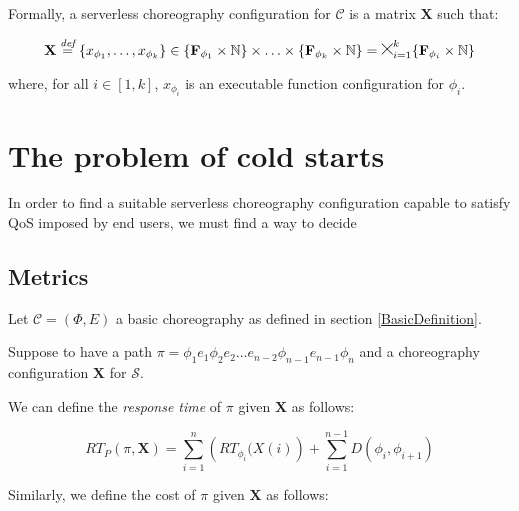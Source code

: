 Formally, a serverless choreography configuration for $\mathcal{C}$ is a matrix $\textbf{X}$ such that:

\begin{equation}
\textbf{X} \mathDef \left\lbrace x_{\phi_{1}}, \ldots, x_{\phi_{k}} \right\rbrace \in \lbrace \textbf{F}_{\phi_{1}} \times \mathbb{N} \rbrace \times \ldots \times \lbrace \textbf{F}_{\phi_{k}} \times \mathbb{N} \rbrace = \Cross_{i = 1}^k \lbrace \textbf{F}_{\phi_{i}} \times \mathbb{N} \rbrace
\end{equation}

where, for all $i \in \left[ 1, k \right]$, $x_{\phi_{i}}$ is an executable function configuration for $\phi_{i}$.


\section{The problem of cold starts}

In order to find a suitable serverless choreography configuration capable to satisfy QoS imposed by end users, we must find a way to decide  





\subsection{Metrics}

Let $\mathcal{C} = (\Phi,E)$ a basic choreography as defined in section \ref{BasicDefinition}.



Suppose to have a path $\pi = \phi_1 e_1 \phi_2 e_2 \ldots e_{n-2}\phi_{n-1} e_{n-1} \phi_n$ and a choreography configuration $\textbf{X}$ for $\mathcal{S}$. 

We can define the \textit{response time} of $\pi$ given $\textbf{X}$ as follows:

\begin{equation}
	RT_P(\pi, \textbf{X}) = \sum_{i = 1}^n \left( RT_{\phi_i} (X(i) \right)  + \sum_{i = 1}^{n-1} D(\phi_i,\phi_{i+1})
\end{equation}

Similarly, we define the cost of $\pi$ given $\textbf{X}$ as follows:

